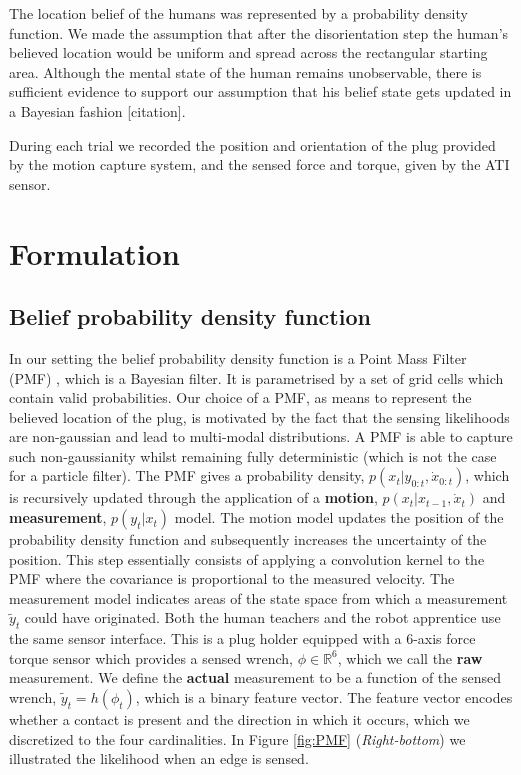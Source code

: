 The location belief of the humans was represented by a probability density function. We made the assumption 
that after the disorientation step the human's believed location would be uniform and spread across the 
rectangular starting area. Although the mental state of the human remains 
unobservable, there is sufficient evidence to support our assumption that his belief state
gets updated in a Bayesian fashion [citation].

During each trial we recorded the position and orientation of the plug provided by the motion capture 
system, and the sensed force and torque, given by the ATI sensor. 


\section{Formulation}\label{ch4:formulation}

\subsection{Belief probability density function}
In our setting the belief probability density function is a Point Mass Filter (PMF) \cite[p.87]{Bergman99recursivebayesian},
which is a  Bayesian filter. It is parametrised by a set of grid cells  which contain valid probabilities.
Our choice of a PMF, as means to represent the believed location of the plug, is motivated by the fact that the 
sensing likelihoods are non-gaussian and lead to multi-modal distributions. A PMF is able to capture such non-gaussianity whilst
remaining fully deterministic (which is not the case for a particle filter).
The PMF gives a probability density, $p(x_t|y_{0:t},\dot{x}_{0:t})$, which is recursively updated through the 
application of a \textbf{motion}, $p(x_t|x_{t-1},\dot{x}_t)$ and \textbf{measurement}, $p(y_t|x_t)$ model. 
The motion model updates the position of the probability density function and subsequently increases the uncertainty 
of the position. This step essentially consists of applying a convolution kernel to the PMF where the covariance 
is proportional to the measured velocity.
The measurement model indicates areas of the state space from which a measurement $\tilde{y}_t$ could have originated. 
Both the human teachers and the robot apprentice use the same sensor interface. This is a plug holder
equipped with a 6-axis force torque sensor which provides a sensed wrench, $\phi \in \mathbb{R}^6$, which we
call the \textbf{raw} measurement. We define the \textbf{actual} measurement to be a function of the sensed wrench, 
$\tilde{y}_t = h(\phi_t)$, which is a binary feature vector. The feature vector encodes whether a contact is present 
and the direction in which it occurs, which we discretized to the four cardinalities.
In Figure \ref{fig:PMF} (\textit{Right-bottom}) we illustrated the likelihood when an edge is sensed.

